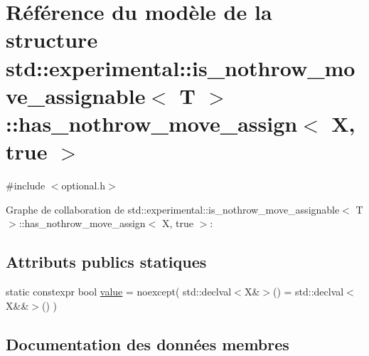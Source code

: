 \hypertarget{structstd_1_1experimental_1_1is__nothrow__move__assignable_1_1has__nothrow__move__assign_3_01_x_00_01true_01_4}{}\section{Référence du modèle de la structure std\+:\+:experimental\+:\+:is\+\_\+nothrow\+\_\+move\+\_\+assignable$<$ T $>$\+:\+:has\+\_\+nothrow\+\_\+move\+\_\+assign$<$ X, true $>$}
\label{structstd_1_1experimental_1_1is__nothrow__move__assignable_1_1has__nothrow__move__assign_3_01_x_00_01true_01_4}


{\ttfamily \#include $<$optional.\+h$>$}



Graphe de collaboration de std\+:\+:experimental\+:\+:is\+\_\+nothrow\+\_\+move\+\_\+assignable$<$ T $>$\+:\+:has\+\_\+nothrow\+\_\+move\+\_\+assign$<$ X, true $>$\+:
\subsection*{Attributs publics statiques}
\begin{DoxyCompactItemize}
\item 
static constexpr bool \hyperlink{structstd_1_1experimental_1_1is__nothrow__move__assignable_1_1has__nothrow__move__assign_3_01_x_00_01true_01_4_a94b7f221dd39c47cff4c6fa0dffaa4b4}{value} = noexcept( std\+::declval$<$X\&$>$() = std\+::declval$<$X\&\&$>$() )
\end{DoxyCompactItemize}


\subsection{Documentation des données membres}
\mbox{\label{structstd_1_1experimental_1_1is__nothrow__move__assignable_1_1has__nothrow__move__assign_3_01_x_00_01true_01_4_a94b7f221dd39c47cff4c6fa0dffaa4b4}} 
